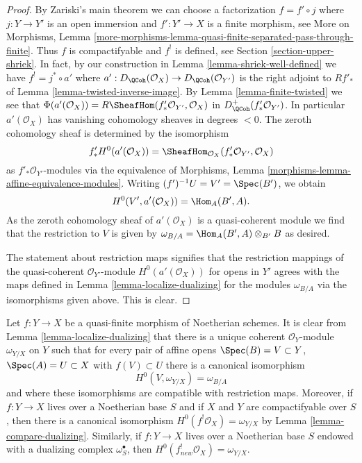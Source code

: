 \begin{proof}
By Zariski's main theorem we can choose a factorization $f = f' \circ j$
where $j : Y \to Y'$ is an open immersion and $f' : Y' \to X$ is a finite
morphism, see More on Morphisms, Lemma
\ref{more-morphisms-lemma-quasi-finite-separated-pass-through-finite}.
Thus $f$ is compactifyable and $f^!$ is defined, see
Section \ref{section-upper-shriek}. In fact, by our construction
in Lemma \ref{lemma-shriek-well-defined} we have
$f^! = j^* \circ a'$ where
$a' : D_\QCoh(\mathcal{O}_X) \to D_\QCoh(\mathcal{O}_{Y'})$
is the right adjoint to $Rf'_*$ of Lemma \ref{lemma-twisted-inverse-image}.
By Lemma \ref{lemma-finite-twisted}
we see that
$\Phi(a'(\mathcal{O}_X)) = R\SheafHom(f'_*\mathcal{O}_{Y'}, \mathcal{O}_X)$ in
$D_\QCoh^+(f'_*\mathcal{O}_{Y'})$. In particular $a'(\mathcal{O}_X)$ has
vanishing cohomology sheaves in degrees $< 0$. The zeroth cohomology sheaf
is determined by the isomorphism
$$
f'_*H^0(a'(\mathcal{O}_X)) =
\SheafHom_{\mathcal{O}_X}(f'_*\mathcal{O}_{Y'}, \mathcal{O}_X)
$$
as $f'_*\mathcal{O}_{Y'}$-modules via the equivalence of
Morphisms, Lemma \ref{morphisms-lemma-affine-equivalence-modules}.
Writing $(f')^{-1}U = V' = \Spec(B')$, we obtain
$$
H^0(V', a'(\mathcal{O}_X)) = \Hom_A(B', A).
$$
As the zeroth cohomology sheaf of $a'(\mathcal{O}_X)$
is a quasi-coherent module we find that
the restriction to $V$ is given by
$\omega_{B/A} = \Hom_A(B', A) \otimes_{B'} B$ as desired.

\medskip\noindent
The statement about restriction maps signifies that the restriction mappings
of the quasi-coherent $\mathcal{O}_{Y'}$-module $H^0(a'(\mathcal{O}_X))$
for opens in $Y'$ agrees with the maps defined in
Lemma \ref{lemma-localize-dualizing}
for the modules $\omega_{B/A}$ via the isomorphisms given above.
This is clear.
\end{proof}

\begin{remark}
\label{remark-relative-dualizing-for-quasi-finite}
Let $f : Y \to X$ be a quasi-finite morphism of Noetherian schemes. It
is clear from Lemma \ref{lemma-localize-dualizing}
that there is a unique coherent $\mathcal{O}_Y$-module
$\omega_{Y/X}$ on $Y$ such that for every pair of affine opens
$\Spec(B) = V \subset Y$, $\Spec(A) = U \subset X$ with $f(V) \subset U$
there is a canonical isomorphism
$$
H^0(V, \omega_{Y/X}) = \omega_{B/A}
$$
and where these isomorphisms are compatible with restriction maps.
Moreover, if $f : Y \to X$ lives over a Noetherian base $S$ and
if $X$ and $Y$ are compactifyable over $S$, then there is a canonical
isomorphism $H^0(f^!\mathcal{O}_X) = \omega_{Y/X}$ by
Lemma \ref{lemma-compare-dualizing}.
Similarly, if $f : Y \to X$ lives over a Noetherian base $S$
endowed with a dualizing complex $\omega_S^\bullet$, then
$H^0(f_{new}^!\mathcal{O}_X) = \omega_{Y/X}$.
\end{remark}

